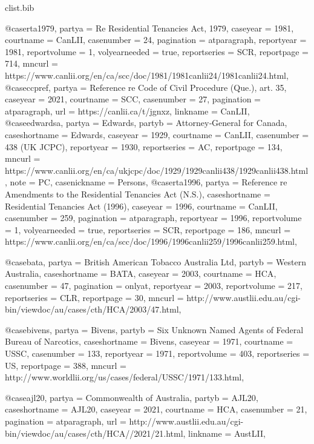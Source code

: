 \begin{filecontents*}[overwrite]{clist\jobname.bib}

@case{rta1979,	partya =  {Re Residential Tenancies Act, 1979},			caseyear =  {1981},	courtname =  {CanLII},	casenumber =  {24},	pagination =  {atparagraph},	reportyear =  {1981},	reportvolume =  {1},	volyearneeded =  {true},	reportseries =  {SCR},	reportpage =  {714},			mncurl =  {https://www.canlii.org/en/ca/scc/doc/1981/1981canlii24/1981canlii24.html},											}
@case{ccpref,	partya =  {Reference re Code of Civil Procedure (Que.), art. 35},			caseyear =  {2021},	courtname =  {SCC},	casenumber =  {27},	pagination =  {atparagraph},						url =  {https://canlii.ca/t/jgnxz},	linkname =  {CanLII},												}
@case{edwardsa,	partya =  {Edwards},	partyb =  {Attorney‑General for Canada},	caseshortname =  {Edwards},	caseyear =  {1929},	courtname =  {CanLII},	casenumber =  {438 (UK JCPC)},		reportyear =  {1930},			reportseries =  {AC},	reportpage =  {134},			mncurl =  {https://www.canlii.org/en/ca/ukjcpc/doc/1929/1929canlii438/1929canlii438.html},						note =  {PC},		casenickname =  {Persons},			}
@case{rta1996,	partya =  {Reference re Amendments to the Residential Tenancies Act (N.S.)},		caseshortname =  {Residential Tenancies Act (1996)},	caseyear =  {1996},	courtname =  {CanLII},	casenumber =  {259},	pagination =  {atparagraph},	reportyear =  {1996},	reportvolume =  {1},	volyearneeded =  {true},	reportseries =  {SCR},	reportpage =  {186},			mncurl =  {https://www.canlii.org/en/ca/scc/doc/1996/1996canlii259/1996canlii259.html},											}

@case{bata,	partya =  {British American Tobacco Australia Ltd},	partyb =  {Western Australia},	caseshortname =  {BATA},	caseyear =  {2003},	courtname =  {HCA},	casenumber =  {47},	pagination =  {onlyat},	reportyear =  {2003},	reportvolume =  {217},		reportseries =  {CLR},	reportpage =  {30},			mncurl =  {http://www.austlii.edu.au/cgi-bin/viewdoc/au/cases/cth/HCA/2003/47.html},											}

@case{bivens,	partya =  {Bivens},	partyb =  {Six Unknown Named Agents of Federal Bureau of Narcotics},	caseshortname =  {Bivens},	caseyear =  {1971},	courtname =  {USSC},	casenumber =  {133},		reportyear =  {1971},	reportvolume =  {403},		reportseries =  {US},	reportpage =  {388},			mncurl =  {http://www.worldlii.org/us/cases/federal/USSC/1971/133.html},											}

@case{ajl20,	partya =  {Commonwealth of Australia},	partyb =  {AJL20},	caseshortname =  {AJL20},	caseyear =  {2021},	courtname =  {HCA},	casenumber =  {21},	pagination =  {atparagraph},						url =  {http://www.austlii.edu.au/cgi-bin/viewdoc/au/cases/cth/HCA//2021/21.html},	linkname =  {AustLII},												}


\end{filecontents*}
